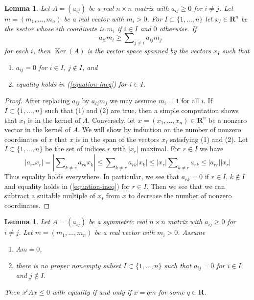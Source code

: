 \documentclass{stacks-project}
\theoremstyle{plain}
\newtheorem{lemma}[subsection]{Lemma}
\theoremstyle{definition}
\theoremstyle{remark}
\numberwithin{equation}{subsection}
\def\Ker{\mathop{\mathrm{Ker}}}
\begin{document}
\begin{lemma}
\label{lemma-recurring-real}
Let $A = (a_{ij})$ be a real $n \times n$ matrix with
$a_{ij} \geq 0$ for $i \not = j$. Let $m = (m_1, \ldots, m_n)$ be a real
vector with $m_i > 0$. For $I \subset \{1, \ldots, n\}$ let
$x_I \in \mathbf{R}^n$
be the vector whose $i$th coordinate is $m_i$ if $i \in I$
and $0$ otherwise. If
\begin{equation}
\label{equation-ineq}
-a_{ii}m_i \geq \sum\nolimits_{j \not = i} a_{ij}m_j
\end{equation}
for each $i$, then $\Ker(A)$ is the vector space
spanned by the vectors $x_I$ such that
\begin{enumerate}
\item $a_{ij} = 0$ for $i \in I$, $j \not \in I$, and
\item equality holds in (\ref{equation-ineq}) for $i \in I$.
\end{enumerate}
\end{lemma}

\begin{proof}
After replacing $a_{ij}$ by $a_{ij}m_j$ we may assume $m_i = 1$ for all $i$.
If $I \subset \{1, \ldots, n\}$ such that (1) and (2) are true,
then a simple computation shows that $x_I$ is in the kernel of $A$.
Conversely, let $x = (x_1, \ldots, x_n) \in \mathbf{R}^n$ be a
nonzero vector in the kernel of $A$. We will show by induction
on the number of nonzero coordinates of $x$ that $x$ is in the
span of the vectors $x_I$ satisfying (1) and (2). Let
$I \subset \{1, \ldots, n\}$ be the set of indices $r$ with $|x_r|$ maximal.
For $r \in I$ we have
$$
|a_{rr} x_r| = |\sum\nolimits_{k \not = r} a_{rk}x_k| \leq
\sum\nolimits_{k \not = r} a_{rk}|x_k| \leq
|x_r| \sum\nolimits_{k \not = r} a_{rk} \leq |a_{rr}||x_r|
$$
Thus equality holds everywhere. In particular, we see that
$a_{rk} = 0$ if $r \in I$, $k \not \in I$ and equality holds
in (\ref{equation-ineq}) for $r \in I$. Then we see that we
can subtract a suitable multiple of $x_I$ from $x$ to decrease
the number of nonzero coordinates.
\end{proof}

\begin{lemma}
\label{lemma-recurring-symmetric-real}
Let $A = (a_{ij})$ be a symmetric real $n \times n$ matrix with
$a_{ij} \geq 0$ for $i \not = j$.
Let $m = (m_1, \ldots, m_n)$ be a real vector with $m_i > 0$.
Assume
\begin{enumerate}
\item $Am = 0$,
\item there is no proper nonempty subset $I \subset \{1, \ldots, n\}$
such that $a_{ij} = 0$ for $i \in I$ and $j \not \in I$.
\end{enumerate}
Then $x^t A x \leq 0$ with equality if and only if $x = qm$
for some $q \in \mathbf{R}$.
\end{lemma}
\end{document}
